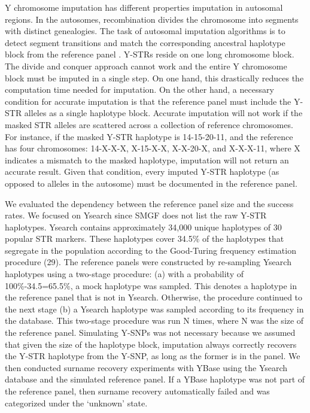 Y chromosome imputation has different properties imputation in autosomal regions. In the autosomes, recombination divides the chromosome into segments with distinct genealogies. The task of autosomal imputation algorithms is to detect segment transitions and match the corresponding ancestral haplotype block from the reference panel \cite{HalperinStephan2009,MarchiniHowie2010}. Y-STRs reside on one long chromosome block. The divide and conquer approach cannot work and the entire Y chromosome block must be imputed in a single step. On one hand, this drastically reduces the computation time needed for imputation. On the other hand, a necessary condition for accurate imputation is that the reference panel must include the Y-STR alleles as a single haplotype block. Accurate imputation will not work if the masked STR alleles are scattered across a collection of reference chromosomes. For instance, if the masked Y-STR haplotype is 14-15-20-11, and the reference has four chromosomes: 14-X-X-X, X-15-X-X, X-X-20-X, and X-X-X-11, where X indicates a mismatch to the masked haplotype, imputation will not return an accurate result. Given that condition, every imputed Y-STR haplotype (as opposed to alleles in the autosome) must be documented in the reference panel. 

We evaluated the dependency between the reference panel size and the success rates. We focused on Ysearch since SMGF does not list the raw Y-STR haplotypes. Ysearch contains approximately 34,000 unique haplotypes of 30 popular STR markers. These haplotypes cover 34.5\% of the haplotypes that segregate in the population according to the Good-Turing frequency estimation procedure (29). The reference panels were constructed by re-sampling Ysearch haplotypes using a two-stage procedure: (a) with a probability of 100\%-34.5=65.5\%, a mock haplotype was sampled. This denotes a haplotype in the reference panel that is not in Ysearch. Otherwise, the procedure continued to the next stage (b) a Ysearch haplotype was sampled according to its frequency in the database. This two-stage procedure was run N times, where N was the size of the reference panel. Simulating Y-SNPs was not necessary because we assumed that given the size of the haplotype block, imputation always correctly recovers the Y-STR haplotype from the Y-SNP, as long as the former is in the panel. We then conducted surname recovery experiments with YBase using the Ysearch database and the simulated reference panel. If a YBase haplotype was not part of the reference panel, then surname recovery automatically failed and was categorized under the ‘unknown' state. 

